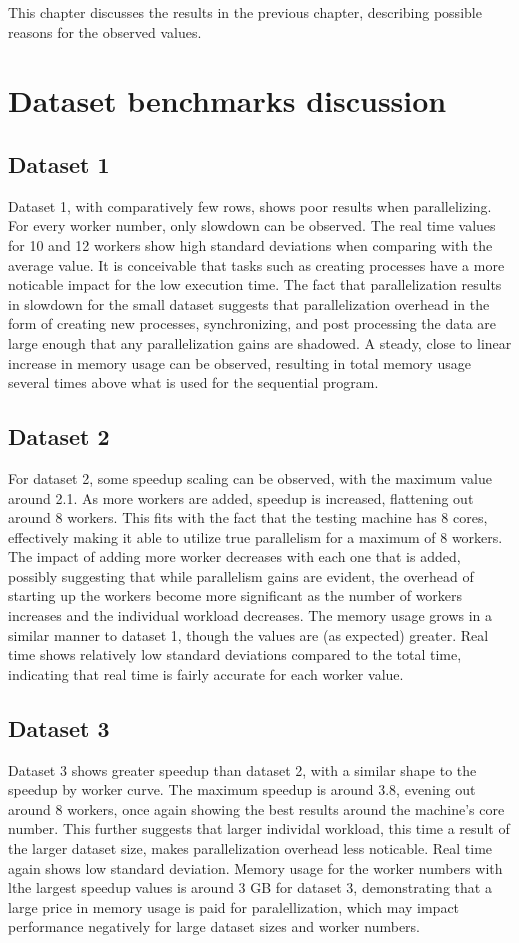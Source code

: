This chapter discusses the results in the previous chapter, describing possible reasons for the observed values.

\section{Dataset benchmarks discussion}
\subsection{Dataset 1}
Dataset 1, with comparatively few rows, shows poor results when parallelizing. For every worker number, only slowdown can be observed.
The real time values for 10 and 12 workers show high standard deviations when comparing with the average value. It is conceivable that
tasks such as creating processes have a more noticable impact for the low execution time. The fact that parallelization results in
slowdown for the small dataset suggests that parallelization overhead in the form of creating new processes, synchronizing, and
post processing the data are large enough that any parallelization gains are shadowed.
A steady, close to linear increase in memory usage can be observed, resulting in total memory usage several times above what is
used for the sequential program. 

\subsection{Dataset 2}
For dataset 2, some speedup scaling can be observed, with the maximum value around 2.1. As more workers are added, speedup is increased,
flattening out around 8 workers. This fits with the fact that the testing machine has 8 cores, effectively making it able to utilize 
true parallelism for a maximum of 8 workers. The impact of adding more worker decreases with each one that is added, possibly suggesting
that while parallelism gains are evident, the overhead of starting up the workers become more significant as the number of workers increases
and the individual workload decreases. The memory usage grows in a similar manner to dataset 1, though the values are (as expected) greater.
Real time shows relatively low standard deviations compared to the total time, indicating that real time is fairly accurate for each worker
value.

\subsection{Dataset 3}
Dataset 3 shows greater speedup than dataset 2, with a similar shape to the speedup by worker curve. The maximum speedup is
around 3.8, evening out around 8 workers, once again showing the best results around the machine's core number. This further suggests that larger
individal workload, this time a result of the larger dataset size, makes parallelization overhead less noticable. Real time again shows
low standard deviation. Memory usage for the worker numbers with lthe largest speedup values is around 3 GB for dataset 3, demonstrating
that a large price in memory usage is paid for paralellization, which may impact performance negatively for large dataset sizes and
worker numbers.


